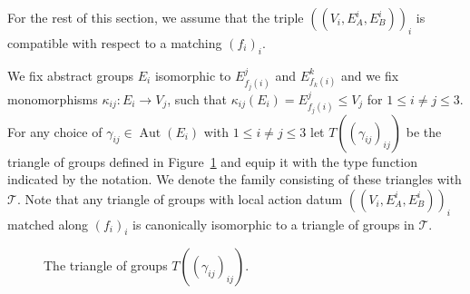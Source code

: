 \documentclass[dvipsnames]{article}
\theoremstyle{definition}
\theoremstyle{remark}
\DeclareMathOperator{\Aut}{Aut}
\begin{document}
    For the rest of this section, we assume that the triple $((V_i,E^i_A, E^i_B))_i$ is compatible with respect to a matching $(f_i)_i$.
    
    We fix abstract groups $E_i$ isomorphic to $E_{f_j(i)}^j$ and $E_{f_k(i)}^k$ and we fix monomorphisms $\kappa_{ij} : E_i \to V_j$, such that $\kappa_{ij}(E_i) = E_{f_j(i)}^j \leq V_j$ for $1 \leq i \neq j \leq 3$. 
    For any choice of $\gamma_{ij} \in \Aut(E_i)$ with $1 \leq i \neq j \leq 3$ let $T((\gamma_{ij})_{ij})$ be the triangle of groups defined in Figure~\ref{fig:T_gamma_ij} and equip it with the type function indicated by the notation. We denote the family consisting of these triangles with $\mathcal T$. Note that any triangle of groups with local action datum $((V_i,E^i_A, E^i_B))_i$ matched along $(f_i)_i$ is canonically isomorphic to a triangle of groups in $\mathcal T$.
    \begin{figure}
        \centering
        \caption{The triangle of groups $T((\gamma_{ij})_{ij})$.}
        \label{fig:T_gamma_ij}
    \end{figure}
\end{document}
